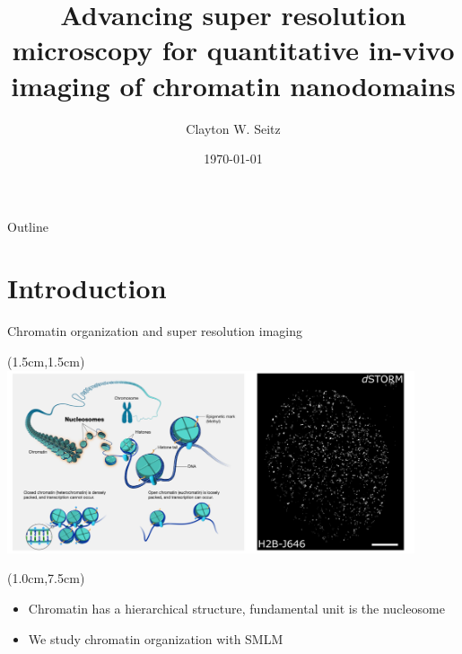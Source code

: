 \documentclass{beamer}					%
\title{Advancing super resolution microscopy for quantitative in-vivo imaging of chromatin nanodomains}	%
\author{Clayton W. Seitz}								%
\date{\today}									%
\begin{document}
\begin{frame}
  \titlepage
\end{frame}

\begin{frame}{Outline}
    \tableofcontents
\end{frame}



%




\section{Introduction}

\begin{frame}{Chromatin organization and super resolution imaging}
\begin{textblock*}{12cm}(1.5cm,1.5cm)
\includegraphics[width=12cm]{Intro2}
\end{textblock*}
\begin{textblock*}{12cm}(1.0cm,7.5cm)
\begin{itemize}
\item Chromatin has a hierarchical structure, fundamental unit is the nucleosome
\item We study chromatin organization with SMLM
\end{itemize}
\end{textblock*}

\end{frame}
\end{document}
